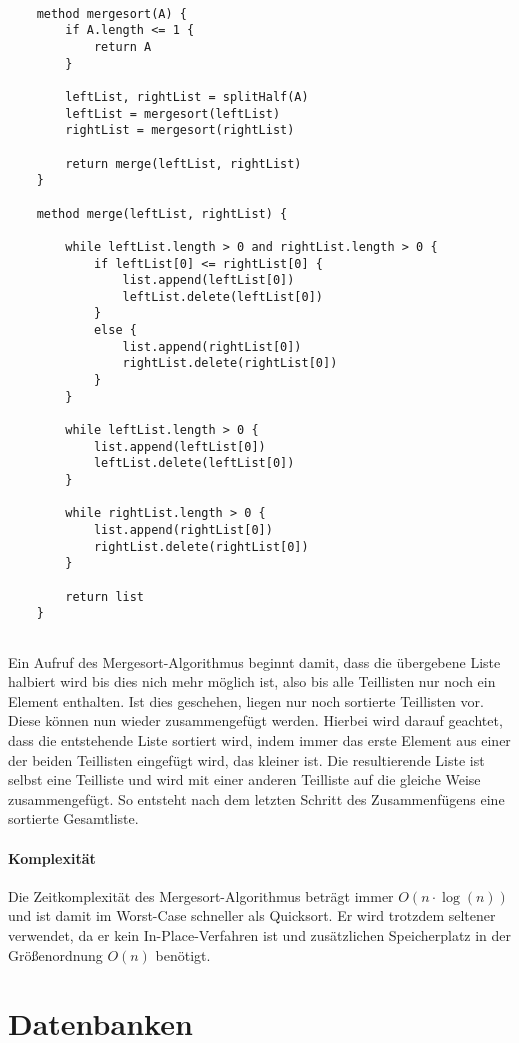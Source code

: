 \documentclass{article}
\begin{document}
	\begin{lstlisting}[caption=Der Mergesort-Algorithmus in einfachem Pseudocode]
	
	method mergesort(A) {
		if A.length <= 1 {
			return A		
		}
		
		leftList, rightList = splitHalf(A)
		leftList = mergesort(leftList)
		rightList = mergesort(rightList)
		
		return merge(leftList, rightList)
	}
	
	method merge(leftList, rightList) {
		
		while leftList.length > 0 and rightList.length > 0 {
			if leftList[0] <= rightList[0] {
				list.append(leftList[0])
				leftList.delete(leftList[0])			
			}
			else {
				list.append(rightList[0])
				rightList.delete(rightList[0])			
			}
		}
		
		while leftList.length > 0 {
			list.append(leftList[0])
			leftList.delete(leftList[0])		
		}
		
		while rightList.length > 0 {
			list.append(rightList[0])
			rightList.delete(rightList[0])
		}
		
		return list
	}
	
	\end{lstlisting}
	
	Ein Aufruf des Mergesort-Algorithmus beginnt damit, dass die übergebene Liste halbiert wird bis dies nich mehr möglich ist, also bis alle Teillisten nur noch ein Element enthalten. Ist dies geschehen, liegen nur noch sortierte Teillisten vor. Diese können nun wieder zusammengefügt werden. Hierbei wird darauf geachtet, dass die entstehende Liste sortiert wird, indem immer das erste Element aus einer der beiden Teillisten eingefügt wird, das kleiner ist. Die resultierende Liste ist selbst eine Teilliste und wird mit einer anderen Teilliste auf die gleiche Weise zusammengefügt. So entsteht nach dem letzten Schritt des Zusammenfügens eine sortierte Gesamtliste.
	
	\paragraph{Komplexität}
	
	Die Zeitkomplexität des Mergesort-Algorithmus beträgt immer $O(n \cdot \log(n))$ und ist damit im Worst-Case schneller als Quicksort. Er wird trotzdem seltener verwendet, da er kein In-Place-Verfahren ist und zusätzlichen Speicherplatz in der Größenordnung $O(n)$ benötigt.

	\section{Datenbanken}
\end{document}
